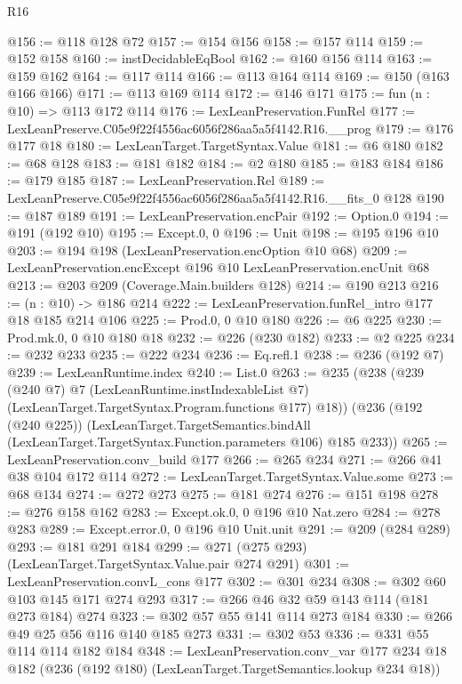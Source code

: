 \begin{lexlean}{R16}
\begin{coremodule}
@156 := @118 @128 @72
@157 := @154 @156
@158 := @157 @114
@159 := @152 @158
@160 := instDecidableEqBool
@162 := @160 @156 @114
@163 := @159 @162
@164 := @117 @114
@166 := @113 @164 @114
@169 := @150 (@163 @166 @166)
@171 := @113 @169 @114
@172 := @146 @171
@175 := fun (n : @10) => @113 @172 @114
@176 := LexLeanPreservation.FunRel
@177 := LexLeanPreserve.C05e9f22f4556ac6056f286aa5a5f4142.R16.__prog
@179 := @176 @177 @18
@180 := LexLeanTarget.TargetSyntax.Value
@181 := @6 @180
@182 := @68 @128
@183 := @181 @182
@184 := @2 @180
@185 := @183 @184
@186 := @179 @185
@187 := LexLeanPreservation.Rel
@189 := LexLeanPreserve.C05e9f22f4556ac6056f286aa5a5f4142.R16.__fits_0 @128
@190 := @187 @189
@191 := LexLeanPreservation.encPair
@192 := Option.{0}
@194 := @191 (@192 @10)
@195 := Except.{0, 0}
@196 := Unit
@198 := @195 @196 @10
@203 := @194 @198 (LexLeanPreservation.encOption @10 @68)
@209 := LexLeanPreservation.encExcept @196 @10 LexLeanPreservation.encUnit @68
@213 := @203 @209 (Coverage.Main.builders @128)
@214 := @190 @213
@216 := (n : @10) -> @186 @214
@222 := LexLeanPreservation.funRel_intro @177 @18 @185 @214 @106
@225 := Prod.{0, 0} @10 @180
@226 := @6 @225
@230 := Prod.mk.{0, 0} @10 @180 @18
@232 := @226 (@230 @182)
@233 := @2 @225
@234 := @232 @233
@235 := @222 @234
@236 := Eq.refl.{1}
@238 := @236 (@192 @7)
@239 := LexLeanRuntime.index
@240 := List.{0}
@263 := @235
    (@238
      (@239
        (@240 @7)
        @7
        (LexLeanRuntime.instIndexableList @7)
        (LexLeanTarget.TargetSyntax.Program.functions @177)
        @18))
    (@236
      (@192 (@240 @225))
      (LexLeanTarget.TargetSemantics.bindAll
        (LexLeanTarget.TargetSyntax.Function.parameters @106)
        @185
        @233))
@265 := LexLeanPreservation.conv_build @177
@266 := @265 @234
@271 := @266 @41 @38 @104 @172 @114
@272 := LexLeanTarget.TargetSyntax.Value.some
@273 := @68 @134
@274 := @272 @273
@275 := @181 @274
@276 := @151 @198
@278 := @276 @158 @162
@283 := Except.ok.{0, 0} @196 @10 Nat.zero
@284 := @278 @283
@289 := Except.error.{0, 0} @196 @10 Unit.unit
@291 := @209 (@284 @289)
@293 := @181 @291 @184
@299 := @271 (@275 @293) (LexLeanTarget.TargetSyntax.Value.pair @274 @291)
@301 := LexLeanPreservation.convL_cons @177
@302 := @301 @234
@308 := @302 @60 @103 @145 @171 @274 @293
@317 := @266 @46 @32 @59 @143 @114 (@181 @273 @184) @274
@323 := @302 @57 @55 @141 @114 @273 @184
@330 := @266 @49 @25 @56 @116 @140 @185 @273
@331 := @302 @53
@336 := @331 @55 @114 @114 @182 @184
@348 := LexLeanPreservation.conv_var
    @177
    @234
    @18
    @182
    (@236 (@192 @180) (LexLeanTarget.TargetSemantics.lookup @234 @18))

\end{coremodule}
\end{lexlean}
